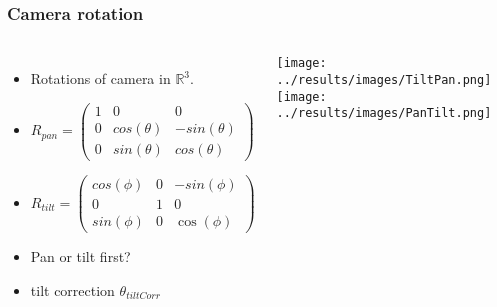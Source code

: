 \documentclass[9pt]{beamer}
\begin{document}
\begin{frame}
	\frametitle{Camera rotation}
	\begin{columns}
		\begin{itemize}
			\item Rotations of camera in $\mathbb{R}^3$.
			\item $R_{pan}=\begin{pmatrix}
						1 & 0 & 0\\
						0 & cos(\theta) & -sin(\theta)\\
						0 & sin(\theta) & cos(\theta)
					\end{pmatrix}$
			\item $R_{tilt}=\begin{pmatrix}
						cos(\phi) & 0 & -sin(\phi)\\
						0 & 1 & 0 \\
						sin(\phi) & 0 & \cos(\phi)
					\end{pmatrix}$
			\item  Pan or tilt first?
			\item  tilt correction $\theta_{tiltCorr}$
		\end{itemize}
		\texttt{[image: ../results/images/TiltPan.png]}\\
		\texttt{[image: ../results/images/PanTilt.png]}
	\end{columns}
\end{frame}
\end{document}

